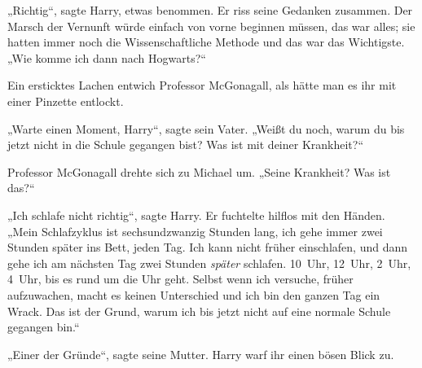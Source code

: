 „Richtig“, sagte Harry, etwas benommen. Er riss seine Gedanken zusammen. Der Marsch der Vernunft würde einfach von vorne beginnen müssen, das war alles; sie hatten immer noch die Wissenschaftliche Methode und das war das Wichtigste. „Wie komme ich dann nach Hogwarts?“

Ein ersticktes Lachen entwich Professor McGonagall, als hätte man es ihr mit einer Pinzette entlockt.

„Warte einen Moment, Harry“, sagte sein Vater. „Weißt du noch, warum du bis jetzt nicht in die Schule gegangen bist? Was ist mit deiner Krankheit?“

Professor McGonagall drehte sich zu Michael um. „Seine Krankheit? Was ist das?“

„Ich schlafe nicht richtig“, sagte Harry. Er fuchtelte hilflos mit den Händen. „Mein Schlafzyklus ist sechsundzwanzig Stunden lang, ich gehe immer zwei Stunden später ins Bett, jeden Tag. Ich kann nicht früher einschlafen, und dann gehe ich am nächsten Tag zwei Stunden \emph{später} schlafen. 10~Uhr, 12~Uhr, 2~Uhr, 4~Uhr, bis es rund um die Uhr geht. Selbst wenn ich versuche, früher aufzuwachen, macht es keinen Unterschied und ich bin den ganzen Tag ein Wrack. Das ist der Grund, warum ich bis jetzt nicht auf eine normale Schule gegangen bin.“

„Einer der Gründe“, sagte seine Mutter. Harry warf ihr einen bösen Blick zu.

